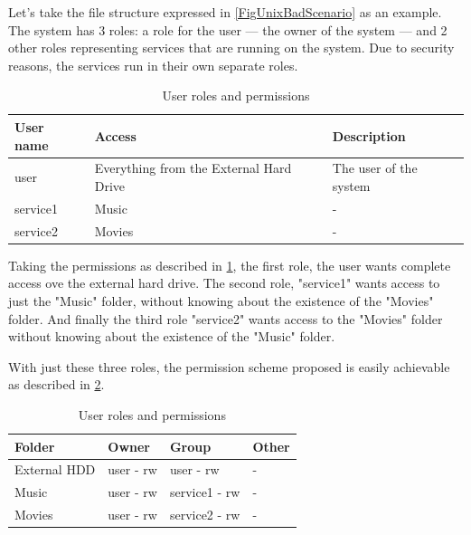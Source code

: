 Let's take the file structure expressed in \ref{FigUnixBadScenario} as an example. The system has 3 roles: a role for the user --- the owner of the system --- and 2 other roles representing services that are running on the system. Due to security reasons, the services run in their own separate roles.

\begin{table}[htbp]
	\begin{center}
		\begin{tabular}{|p{40pt}|p{220pt}|p{120pt}|}
			\hline User name  &  Access &  Description \\
			\hline 
			\hline user & Everything from the External Hard Drive & The user of the system \\
			\hline service1 & Music & - \\
			\hline service2 & Movies & - \\
			\hline
		\end{tabular}
	\end{center}
	\caption{User roles and permissions}
	\label{UnixRolesAndPerms}
\end{table}

Taking the permissions as described in \ref{UnixRolesAndPerms}, the first role, the user wants complete access ove the external hard drive. The second role, "service1" wants access to just the "Music" folder, without knowing about the existence of the "Movies" folder. And finally the third role "service2" wants access to the "Movies" folder without knowing about the existence of the "Music" folder. 

With just these three roles, the permission scheme proposed is easily achievable as described in \ref{UnixRolesAndPerms2}.
\begin{table}[htbp]
	\begin{center}
		\begin{tabular}{|p{80pt}|p{80pt}|p{80pt}|p{50pt}|}
		\hline Folder & Owner & Group & Other \\
		\hline
		\hline External HDD & user - rw & user - rw & - \\
		\hline Music & user - rw & service1 - rw & - \\
		\hline Movies & user - rw & service2 - rw & - \\
		\hline
		\end{tabular}
	\end{center}
	\caption{User roles and permissions}
	\label{UnixRolesAndPerms2}
\end{table}

